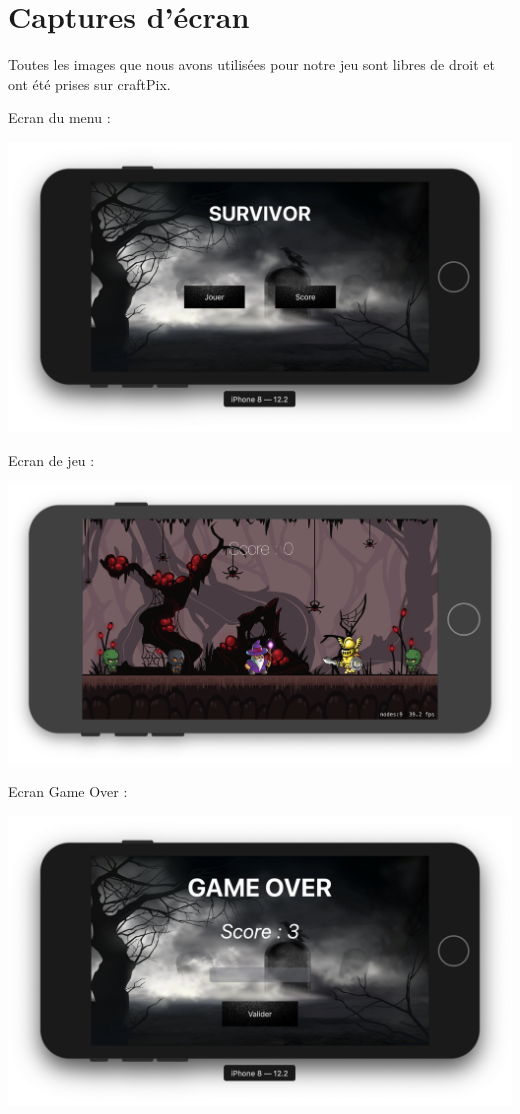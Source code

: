 \documentclass{article}
\begin{document}
\section{Captures d'écran}
\label{section:capture}

Toutes les images que nous avons utilisées pour notre jeu sont libres de droit et ont été prises sur craftPix\cite{craftPix}. 
\bigskip

Ecran du menu : 
\begin{center}
  \includegraphics[scale=0.4]{menu.png}
\end{center}

\cleardoublepage

Ecran de jeu : 
\begin{center}
  \includegraphics[scale=0.4]{jeu.png}
\end{center}

Ecran Game Over : 
\begin{center}
  \includegraphics[scale=0.4]{gameover.png}
\end{center}
\end{document}
